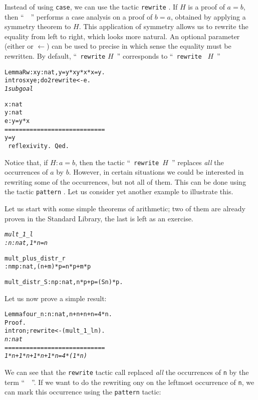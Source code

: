 \documentclass[11pt]{article}
\newcommand{\refmancite}[1]{{}}
\begin{document}
Instead of using \texttt{case}, we can use the tactic
\texttt{rewrite} \refmancite{Section \ref{Rewrite}}.  If $H$ is a proof
of  $a=b$, then
``~~''
 performs a case analysis on a proof of $b=a$, obtained by applying a
symmetry theorem to $H$. This application of symmetry allows us to rewrite
the equality from left to right, which looks more natural. An optional
parameter (either \texttt{\arrow{}} or \texttt{$\leftarrow$}) can be used to precise
in which sense the equality must be rewritten.  By default,
``~\texttt{rewrite} $H$~'' corresponds to ``~\texttt{rewrite \arrow{}} $H$~''
\begin{alltt}
Lemma Rw :  {\prodsym} x y: nat, y = y * x {\arrow} y * x * x = y.
 intros x y e; do 2 rewrite <- e.
\it
1 subgoal

  x : nat
  y : nat
  e : y = y * x
  ============================
   y = y
\tt
 reflexivity.
Qed.
\end{alltt}

Notice that, if $H:a=b$, then the tactic ``~\texttt{rewrite $H$}~''
 replaces \textsl{all} the
occurrences of $a$ by $b$. However, in certain situations we could be
interested in rewriting some of the occurrences, but not all of them.
This can be done using the tactic \texttt{pattern} \refmancite{Section
\ref{Pattern}}.  Let us consider yet another example to
illustrate this.

Let us start with some simple theorems of arithmetic; two of them
are already proven in the Standard Library, the last is left as an exercise.

\begin{alltt}
\it
mult_1_l
     : {\prodsym} n : nat, 1 * n = n

mult_plus_distr_r
     : {\prodsym} n m p : nat, (n + m) * p = n * p + m * p

mult_distr_S : {\prodsym} n p : nat, n * p + p = (S n)* p.
\end{alltt}

Let us now prove a simple result:

\begin{alltt}
Lemma four_n : {\prodsym} n:nat, n+n+n+n = 4*n.
Proof.
 intro n;rewrite <- (mult_1_l n).
\it
  n : nat
  ============================
   1 * n + 1 * n + 1 * n + 1 * n = 4 * (1 * n)
\end{alltt}

We can see that the \texttt{rewrite} tactic call replaced \emph{all}
the occurrences of \texttt{n} by the term ``~~''.
If we want to do the rewriting ony on the leftmost occurrence of
\texttt{n}, we can mark this occurrence using the \texttt{pattern}
tactic:
\end{document}
